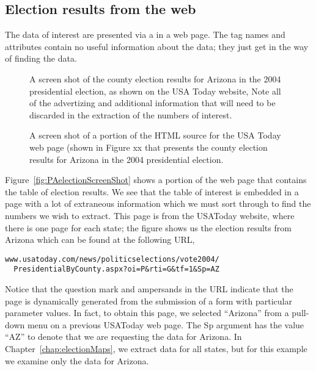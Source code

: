 \subsection{Election results from the web} 
The data of interest are presented via a 
 in a web page. 
The  tag names and attributes contain no useful 
information about the data; they just get in the way of finding 
the data.

\begin{figure}
\caption{A screen shot of the county election results for Arizona in
the 2004 presidential election, as shown on the USA Today website,
Note all of the advertizing and additional information that will need
to be discarded in the extraction of the numbers of interest.
}
\label{fig:AZScreenShot}
\end{figure}


\begin{figure}
\caption{A screen shot of a portion of the HTML source for the USA Today
web page (shown in Figure xx that presents the
county election results for Arizona in the 2004 presidential election.
}
\label{fig:AZSourceScreenShot}
\end{figure}

Figure~\ref{fig:PAelectionScreenShot} shows a portion of the web page
that contains the table of election results.
We see that the table of interest is embedded in a page with a lot
of extraneous information which we must sort through to find the 
numbers we wish to extract. 
This page is from the USAToday website, where there
is one page for each state; the figure shows us the election results 
from Arizona which can be found at the following URL,
\begin{verbatim}
www.usatoday.com/news/politicselections/vote2004/
  PresidentialByCounty.aspx?oi=P&rti=G&tf=1&Sp=AZ
\end{verbatim}
Notice that the question mark and ampersands in the URL indicate
that the page is dynamically generated from the submission of 
a form with particular parameter values.
In fact, to obtain this page, we selected ``Arizona'' from a 
pull-down menu on a previous USAToday web page.
The Sp argument has the value ``AZ'' to denote that we are 
requesting the data for Arizona.
In Chapter~\ref{chap:electionMaps}, we extract data for all states, 
but for this example we examine only the data for Arizona.  

